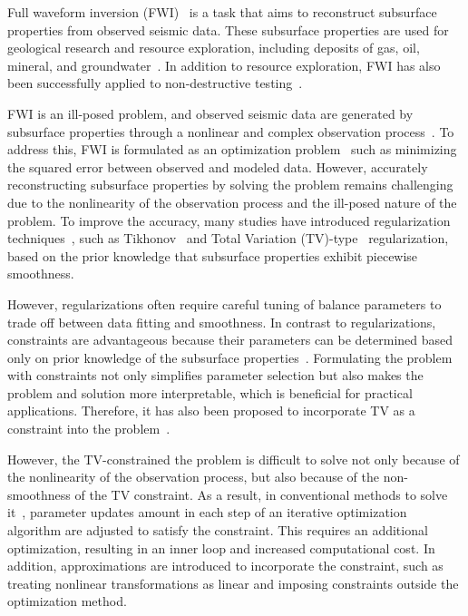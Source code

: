 Full waveform inversion (FWI)~\cite{FWI0,FWI1} is a task that aims to reconstruct subsurface properties from observed seismic data.
These subsurface properties are used for geological research and resource exploration, including deposits of gas, oil, mineral, and groundwater~\cite{FWI1,FWIApplicationGroundwater0,FWIApplicationGroundwater1}.
In addition to resource exploration, FWI has also been successfully applied to non-destructive testing~\cite{FWIApplicationNonDestructiveTesting0,FWIApplicationNonDestructiveTesting1}.

FWI is an ill-posed problem, and observed seismic data are generated by subsurface properties through a nonlinear and complex observation process~\cite{FWI1}.
To address this, FWI is formulated as an optimization problem~\cite{FWI0,CustomFWI0,CustomFWI1,CustomFWI2,CustomFWI3,CustomFWI4,CustomFWI5} such as minimizing the squared error between observed and modeled data.
However, accurately reconstructing subsurface properties by solving the problem remains challenging due to the nonlinearity of the observation process and the ill-posed nature of the problem.
To improve the accuracy, many studies have introduced regularization techniques~\cite{FWI-with-tikhonov-regularization,FWI-with-TV-regularization,FWI-with-directional-TV-regularization,FWI-with-high-order-TV-regularization,FWI-with-TGV-regularization}, such as Tikhonov~\cite{tikhonov} and Total Variation (TV)-type~\cite{TV,TGV} regularization, based on the prior knowledge that subsurface properties exhibit piecewise smoothness.

However, regularizations often require careful tuning of balance parameters to trade off between data fitting and smoothness.
In contrast to regularizations, constraints are advantageous because their parameters can be determined based only on prior knowledge of the subsurface properties~\cite{constraints-vs-penalties-in-FWI}.
Formulating the problem with constraints not only simplifies parameter selection but also makes the problem and solution more interpretable, which is beneficial for practical applications.
Therefore, it has also been proposed to incorporate TV as a constraint into the problem~\cite{FWI-with-TV-constraint,FWI-with-TV-constraint2,FWI-with-TV-constraint3}.

However, the TV-constrained the problem is difficult to solve not only because of the nonlinearity of the observation process, but also because of the non-smoothness of the TV constraint.
As a result, in conventional methods to solve it~\cite{FWI-with-TV-constraint,FWI-with-TV-constraint2,FWI-with-TV-constraint3}, parameter updates amount in each step of an iterative optimization algorithm are adjusted to satisfy the constraint.
This requires an additional optimization, resulting in an inner loop and increased computational cost.
In addition, approximations are introduced to incorporate the constraint, such as treating nonlinear transformations as linear and imposing constraints outside the optimization method.

